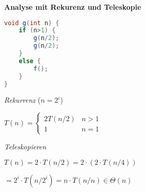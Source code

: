 \begin{sectionbox}
\textbf{Analyse mit Rekurenz und Teleskopie}\par\vspace{-4px}
\begin{lstlisting}[language=Java]
void g(int n) {
    if (n>1) {
        g(n/2);
        g(n/2);
    }
    else {
        f();
    }
}
\end{lstlisting}\vspace{-4px}
\textit{Rekurrenz} ($n=2^{i}$)\par
$T(n)=\left\{\begin{array}{ll}2 T(n / 2) & n>1 \\ 1 & n=1\end{array}\right.$\par\smallskip
\textit{Teleskopieren}\par
$T(n)=2 \cdot T(n / 2) = 2 \cdot (2 \cdot T(n / 4)) $ \par
$= 2^{i} \cdot T(n/2^{i}) = n \cdot T(n/n) \in \Theta(n)$\par\smallskip

\end{sectionbox}